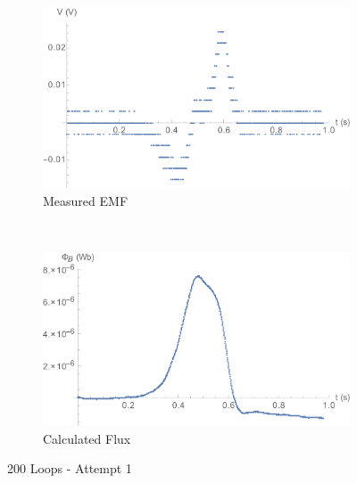 \documentclass[a4paper]{scrartcl}
\begin{document}
\begin{figure}[p]
    \centering
    \begin{subfigure}[b]{0.45\textwidth}
        \includegraphics[width = \textwidth]{200_1_voltage.png}
        \caption{Measured EMF}
    \end{subfigure}
    ~
    \begin{subfigure}[b]{0.45\textwidth}
        \includegraphics[width = \textwidth]{200_1_flux.png}
        \caption{Calculated Flux}
    \end{subfigure}
    \caption{200 Loops - Attempt 1}
    \label{fig:200_1}
\end{figure}
\end{document}
